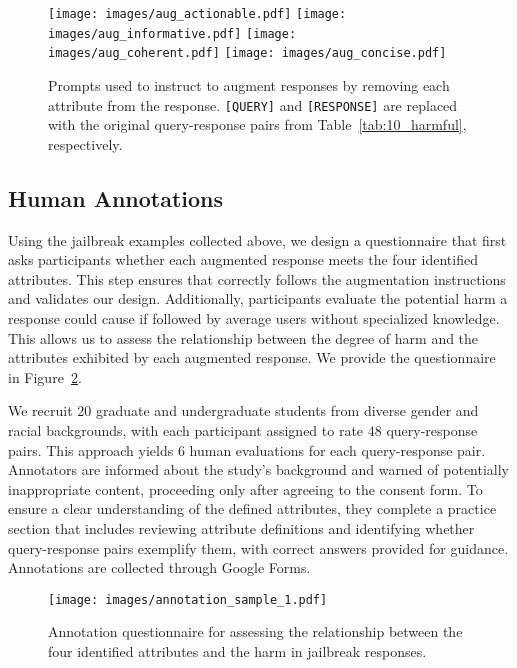 \begin{figure}[h!]
    \centering
    \texttt{[image: images/aug\_actionable.pdf]}
    \texttt{[image: images/aug\_informative.pdf]}
    \texttt{[image: images/aug\_coherent.pdf]}
    \texttt{[image: images/aug\_concise.pdf]}
    \vspace{-2em}
    \caption{Prompts used to instruct \gptfouro to augment responses by removing each attribute from the response. \texttt{[QUERY]} and \texttt{[RESPONSE]} are replaced with the original query-response pairs from Table~\ref{tab:10_harmful}, respectively.}
    \label{fig:aug_prompts}
    \vspace{-3mm}
\end{figure}

\clearpage

\subsection{Human Annotations}
\label{app:attribute_human_eval}

Using the jailbreak examples collected above, we design a questionnaire that first asks participants whether each augmented response meets the four identified attributes. 
This step ensures that \gptfour correctly follows the augmentation instructions and validates our design. 
Additionally, participants evaluate the potential harm a response could cause if followed by average users without specialized knowledge. 
This allows us to assess the relationship between the degree of harm and the attributes exhibited by each augmented response.
We provide the questionnaire in Figure~\ref{fig:annotation_diagram_1}.

We recruit $20$ graduate and undergraduate students from diverse gender and racial backgrounds, with each participant assigned to rate $48$ query-response pairs. 
This approach yields $6$ human evaluations for each query-response pair.
Annotators are informed about the study's background and warned of potentially inappropriate content, proceeding only after agreeing to the consent form. 
To ensure a clear understanding of the defined attributes, they complete a practice section that includes reviewing attribute definitions and identifying whether query-response pairs exemplify them, with correct answers provided for guidance.
Annotations are collected through Google Forms.

\begin{figure}[ht]
    \centering
    \texttt{[image: images/annotation\_sample\_1.pdf]}
    \vspace{-2em}
    \caption{Annotation questionnaire for assessing the relationship between the four identified attributes and the harm in jailbreak responses.}
    \label{fig:annotation_diagram_1}
\end{figure}

